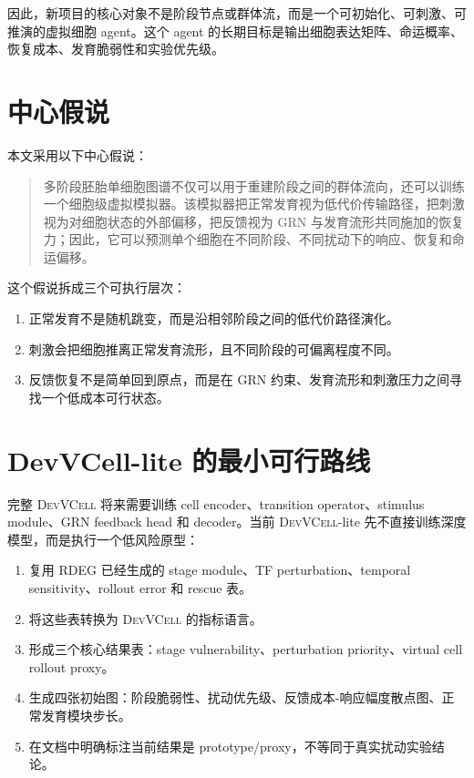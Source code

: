 \documentclass[UTF8,12pt]{ctexart}
\newcommand{\DevVCell}{\textsc{DevVCell}}
\newcommand{\RDEG}{\textsc{RDEG}}
\newcommand{\GRN}{\textsc{GRN}}
\begin{document}
因此，新项目的核心对象不是阶段节点或群体流，而是一个可初始化、可刺激、可推演的虚拟细胞 agent。这个 agent 的长期目标是输出细胞表达矩阵、命运概率、恢复成本、发育脆弱性和实验优先级。

\section{中心假说}

本文采用以下中心假说：

\begin{quote}
多阶段胚胎单细胞图谱不仅可以用于重建阶段之间的群体流向，还可以训练一个细胞级虚拟模拟器。该模拟器把正常发育视为低代价传输路径，把刺激视为对细胞状态的外部偏移，把反馈视为 \GRN{} 与发育流形共同施加的恢复力；因此，它可以预测单个细胞在不同阶段、不同扰动下的响应、恢复和命运偏移。
\end{quote}

这个假说拆成三个可执行层次：

\begin{enumerate}[label=\arabic*.]
    \item 正常发育不是随机跳变，而是沿相邻阶段之间的低代价路径演化。
    \item 刺激会把细胞推离正常发育流形，且不同阶段的可偏离程度不同。
    \item 反馈恢复不是简单回到原点，而是在 \GRN{} 约束、发育流形和刺激压力之间寻找一个低成本可行状态。
\end{enumerate}

\section{DevVCell-lite 的最小可行路线}

完整 \DevVCell{} 将来需要训练 cell encoder、transition operator、stimulus module、\GRN{} feedback head 和 decoder。当前 \DevVCell{}-lite 先不直接训练深度模型，而是执行一个低风险原型：

\begin{enumerate}[label=\arabic*.]
    \item 复用 \RDEG{} 已经生成的 stage module、TF perturbation、temporal sensitivity、rollout error 和 rescue 表。
    \item 将这些表转换为 \DevVCell{} 的指标语言。
    \item 形成三个核心结果表：stage vulnerability、perturbation priority、virtual cell rollout proxy。
    \item 生成四张初始图：阶段脆弱性、扰动优先级、反馈成本-响应幅度散点图、正常发育模块步长。
    \item 在文档中明确标注当前结果是 prototype/proxy，不等同于真实扰动实验结论。
\end{enumerate}
\end{document}
